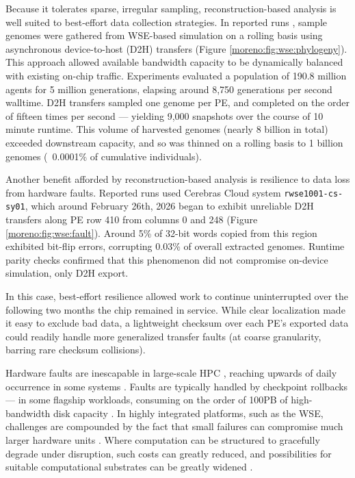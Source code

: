 Because it tolerates sparse, irregular sampling, reconstruction-based analysis is well suited to best-effort data collection strategies.
In reported runs \cite{singhvi2025scalable}, sample genomes were gathered from WSE-based simulation on a rolling basis using asynchronous device-to-host (D2H) transfers (Figure \ref{moreno:fig:wse:phylogeny}).
This approach allowed available bandwidth capacity to be dynamically balanced with existing on-chip traffic.
Experiments evaluated a population of 190.8 million agents for 5 million generations, elapsing around 8{\small,}750 generations per second walltime.
D2H transfers sampled one genome per PE, and completed on the order of fifteen times per second --- yielding 9{\small,}000 snapshots over the course of 10 minute runtime.
This volume of harvested genomes (nearly 8 billion in total) exceeded downstream capacity, and so was thinned on a rolling basis to 1 billion genomes (~0.0001\% of cumulative individuals).

Another benefit afforded by reconstruction-based analysis is resilience to data loss from hardware faults.
Reported runs used Cerebras Cloud system \texttt{rwse1001-cs-sy01}, which around February 26th, 2026 began to exhibit unreliable D2H transfers along PE row 410 from columns 0 and 248 (Figure \ref{moreno:fig:wse:fault}).
Around 5\% of 32-bit words copied from this region exhibited bit-flip errors, corrupting 0.03\% of overall extracted genomes.
Runtime parity checks confirmed that this phenomenon did not compromise on-device simulation, only D2H export.

In this case, best-effort resilience allowed work to continue uninterrupted over the following two months the chip remained in service.
While clear localization made it easy to exclude bad data, a lightweight checksum over each PE's exported data could readily handle more generalized transfer faults (at coarse granularity, barring rare checksum collisions).

Hardware faults are inescapable in large-scale HPC \cite{gupta2017failures,navaux2023challenges}, reaching upwards of daily occurrence in some systems \cite{kokolis2025revisiting}.
Faults are typically handled by checkpoint rollbacks \cite{gupta2017failures,zhu2025understanding} --- in some flagship workloads, consuming on the order of 100PB of high-bandwidth disk capacity \cite{frontiere2025cosmological}.
In highly integrated platforms, such as the WSE, challenges are compounded by the fact that small failures can compromise much larger hardware units \cite{cerebras2025yield}.
Where computation can be structured to gracefully degrade under disruption, such costs can greatly reduced, and possibilities for suitable computational substrates can be greatly widened \cite{markovi2020physics,ackley2011pursue,dreslinski2010near}.

